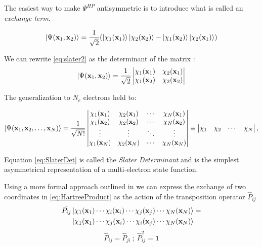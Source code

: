 \documentclass[a4paper,12pt]{article}
\begin{document}
The easiest way to make $\Psi^{HP}$ antisymmetric is to introduce what is called an \textit{exchange term}.

\begin{equation}\label{eq:slater2}
	\ket{\Psi(\mathbf{x}_1,\mathbf{x}_2)} = \frac{1}{\sqrt{2}} (\ket{\chi_1(\mathbf{x}_1)} \ket{ \chi_2(\mathbf{x}_2)} - \ket{\chi_1(\mathbf{x}_2)} \ket{\chi_2(\mathbf{x}_1)} )
\end{equation}

We can rewrite \eqref{eq:slater2} as the determinant of the matrix :
\begin{equation}
\ket{\Psi(\mathbf{x}_1,\mathbf{x}_2)} = \frac{1}{\sqrt{2}}
\begin{vmatrix}
\chi_1(\mathbf{x}_1) & \chi_2(\mathbf{x}_1) \\
\chi_1(\mathbf{x}_2) & \chi_2(\mathbf{x}_2) 
\end{vmatrix}
\end{equation}

The generalization to $N_e$ electrons held to:

\begin{equation}\label{eq:SlaterDet}
\ket{\Psi(\mathbf{x}_1, \mathbf{x}_2, \ldots, \mathbf{x}_N)} =
\frac{1}{\sqrt{N!}}
\left|
	\begin{matrix} 
   		\chi_1(\mathbf{x}_1) & \chi_2(\mathbf{x}_1) & \cdots & \chi_N(\mathbf{x}_1) \\
        \chi_1(\mathbf{x}_2) & \chi_2(\mathbf{x}_2) & \cdots & \chi_N(\mathbf{x}_2) \\
		\vdots & \vdots & \ddots & \vdots \\
        \chi_1(\mathbf{x}_N) & \chi_2(\mathbf{x}_N) & \cdots & \chi_N(\mathbf{x}_N)
    \end{matrix} 
	\right|\equiv \left| 
	\begin{matrix}
		   \chi _1 & \chi _2 & \cdots  & \chi _N  \\
	\end{matrix}
   \right|,
\end{equation}

Equation \eqref{eq:SlaterDet} is called the \textit{Slater Determinant} and is the simplest asymmetrical representation of a multi-electron state function.

Using a more formal approach outlined in \cite[p.357-362]{Sakurai} we can express the exchange of two coordinates in \eqref{eq:HartreeProduct} as the action of the transposition operator $\hat{P}_{ij}$ 
\begin{align} \label{eq:transpositionOp}
	\begin{split}
		\hat{P_{ij}} & \ket{\chi_1(\mathbf{x}_1)   \cdots  \chi_i(\mathbf{x}_i)  \cdots  \chi_j(\mathbf{x}_j)  \cdots   \chi_N(\mathbf{x}_N)} =   \\ 
		& \ket{\chi_1(\mathbf{x}_1)   \cdots  \chi_j(\mathbf{x}_i)  \cdots  \chi_i(\mathbf{x}_j) \cdots  \chi_N(\mathbf{x}_N)} 
	\end{split}
\end{align}
\begin{equation*}
	\hat{P}_{ij} = \hat{P}_{ji} ~;~
	\hat{P}_{ij}^2 = \mathbf{1}
\end{equation*}
\end{document}
